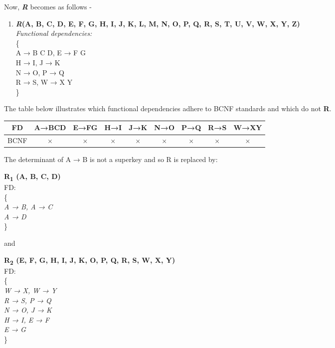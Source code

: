 Now, \textbf{\emph{R}} becomes as follows -\\
\begin{enumerate}
\item \textbf{\emph{R}(A, B, C, D, E, F, G, H, I, J, K, L, M, N, O, P, Q, R, S, T, U, V, W, X, Y, Z)}\\
\textit{Functional dependencies:}\\
\{\\
\hspace{1cm} A → B C D, E → F G\\
\hspace{1cm} H → I, J → K\\
\hspace{1cm} N → O, P → Q\\
\hspace{1cm} R → S, W → X Y\\
\}
\end{enumerate}

The table below illustrates which functional dependencies adhere to BCNF standards and which do not \textbf{R}.


\begin{center}
\begin{tabular}{ |c|c|c|c|c|c|c|c|c| }
\hline
 FD&A→BCD&E→FG&H→I&J→K&N→O&P→Q&R→S&W→XY\\ 
\hline
BCNF&$\times$&$\times$&$\times$&$\times$&$\times$&$\times$&$\times$&$\times$ \\ \hline
\end{tabular}
\end{center}

The determinant of A → B is not a superkey and so R is replaced by:\\

\begin{adjustwidth}{2cm}{}
\textbf{R\textsubscript{1} (A, B, C, D)}\\
FD:\\
\{\\ 
\textit{
A → B, A → C\\
A → D\\
} 
\}\\
\end{adjustwidth} 
and\\ 

\begin{adjustwidth}{2cm}{}
\textbf{R\textsubscript{2} (E, F, G, H, I, J, K, O, P, Q, R, S, W, X, Y)}\\
FD:\\ 
\{ \\ 
\textit{
W → X, W → Y\\
R → S, P → Q\\
N → O, J → K\\
H → I, E → F\\
E → G\\
}
\}\\ \\
\end{adjustwidth} 


